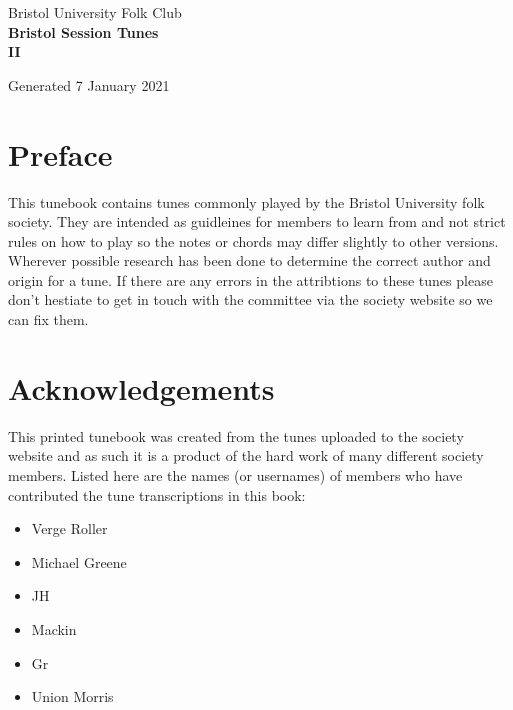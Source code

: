 \documentclass[12pt,a4paper,twoside]{article}
\makeatletter
\newcommand{\thetitle}{Bristol Session Tunes \\ \vspace{0.65cm} II}
\newcommand{\thedate}{7 January 2021}
\renewcommand\tableofcontents{%
    \begin{multicols}{2}[
      \centering
      \section*{\large\contentsname
        \@mkboth{%
           \MakeUppercase\contentsname}{\MakeUppercase\contentsname}}]
    \@starttoc{toc}%
    \end{multicols}
}
\makeatother
\begin{document}
\begin{titlepage}
   \begin{center}
       \large Bristol University Folk Club \\

       \vspace{4cm}
       \textbf{\Huge \thetitle}

       \vspace{0.5cm}
       Generated \thedate

       \vspace{1.5cm}

       \vfill

   \end{center}
\end{titlepage}

\tableofcontents

\section{Preface}

This tunebook contains tunes commonly played by the Bristol University folk society. They are intended as guidleines for members to learn from and not strict rules on how to play so the notes or chords may differ slightly to other versions.
Wherever possible research has been done to determine the correct author and origin for a tune. If there are any errors in the attribtions to these tunes please don't hestiate to get in touch with the committee via the society website so we can fix them.

\section{Acknowledgements}

This printed tunebook was created from the tunes uploaded to the society website and as such it is a product of the hard work of many different society members. Listed here are the names (or usernames) of members who have contributed the tune transcriptions in this book:

\begin{multicols}{2}
\begin{itemize}\item Verge Roller
\item Michael Greene
\item JH
\item Mackin
\item Gr
\item Union Morris
\end{itemize}

\end{multicols}
\end{document}
